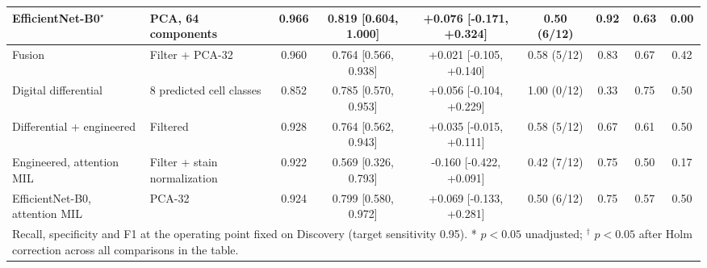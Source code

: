 \begin{table}[!t]
{\begin{tabular}{llccccccc}
EfficientNet-B0$^{\star}$ & PCA, 64 components & 0.966 & 0.819 [0.604, 1.000] & +0.076 [-0.171, +0.324] & 0.50 (6/12) & 0.92 & 0.63 & 0.00 \\
\midrule
Fusion & Filter + PCA-32 & 0.960 & 0.764 [0.566, 0.938] & +0.021 [-0.105, +0.140] & 0.58 (5/12) & 0.83 & 0.67 & 0.42 \\
Digital differential & 8 predicted cell classes & 0.852 & 0.785 [0.570, 0.953] & +0.056 [-0.104, +0.229] & 1.00 (0/12) & 0.33 & 0.75 & 0.50 \\
Differential + engineered & Filtered & 0.928 & 0.764 [0.562, 0.943] & +0.035 [-0.015, +0.111] & 0.58 (5/12) & 0.67 & 0.61 & 0.50 \\
Engineered, attention MIL & Filter + stain normalization & 0.922 & 0.569 [0.326, 0.793] & -0.160 [-0.422, +0.091] & 0.42 (7/12) & 0.75 & 0.50 & 0.17 \\
EfficientNet-B0, attention MIL & PCA-32 & 0.924 & 0.799 [0.580, 0.972] & +0.069 [-0.133, +0.281] & 0.50 (6/12) & 0.75 & 0.57 & 0.50 \\
\bottomrule
\multicolumn{9}{l}{\footnotesize Recall, specificity and F1 at the operating point fixed on Discovery (target sensitivity 0.95). * $p<0.05$ unadjusted; $^{\dagger}$ $p<0.05$ after Holm correction across all comparisons in the table.}
\end{tabular}}
\end{table}